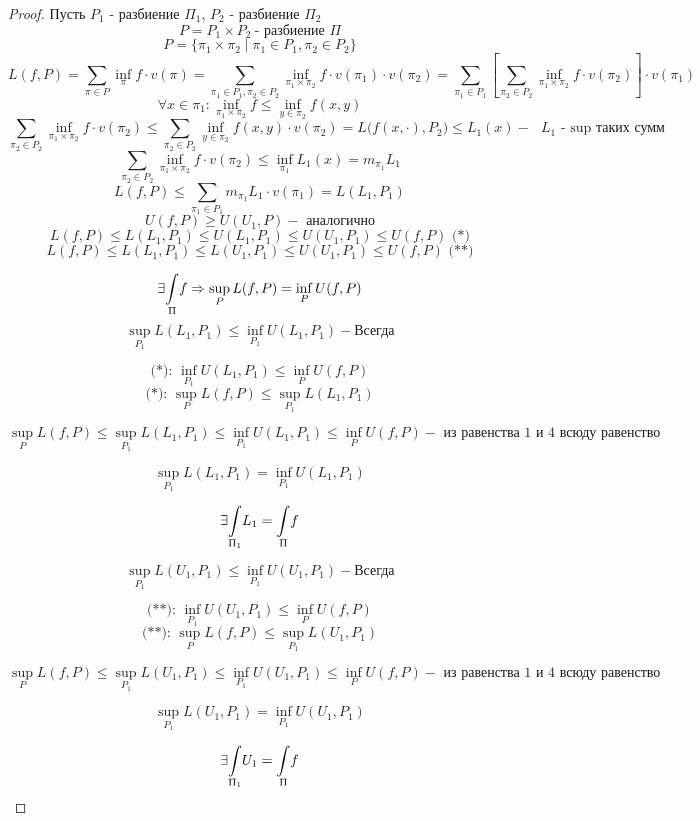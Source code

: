     \begin{proof}
        \par Пусть $P_1$ - разбиение $\Pi_1$, $P_2$ - разбиение $\Pi_2$
        $$P = P_1 \times P_2 \ \text{- разбиение } \Pi$$ 
        $$P = \{\pi_1 \times \pi_2 \mid \pi_1 \in P_1, \pi_2 \in P_2\}$$
        $$L(f, P) = \sum\limits_{\pi \in P} \inf_{\pi} f \cdot v(\pi) = \sum\limits_{\pi_1 \in P_1, \pi_2 \in P_2} \inf_{\pi_1 \times \pi_2} f \cdot v(\pi_1) \cdot v(\pi_2) = \sum\limits_{\pi_1 \in P_1} \left[ \sum\limits_{\pi_2 \in P_2} \inf_{\pi_1 \times \pi_2} f \cdot v(\pi_2) \right] \cdot v(\pi_1)$$
        $$\forall x\in \pi_1: \inf_{\pi_1 \times \pi_2} f \le \inf_{y \in \pi_2} f(x, y)$$
        $$\sum\limits_{\pi_2 \in P_2} \inf_{\pi_1 \times \pi_2} f \cdot v(\pi_2) \le \sum\limits_{\pi_2 \in P_2} \inf_{y \in \pi_2} f(x,y) \cdot v(\pi_2) = L\big(f(x, \cdot), P_2\big) \le L_1 (x) - \text{ $L_1$ - sup таких сумм} $$
        $$\sum\limits_{\pi_2 \in P_2} \inf_{\pi_1 \times \pi_2} f \cdot v(\pi_2) \le \inf_{\pi_1} L_1(x) = m_{\pi_1} L_1$$
        $$L(f, P) \le \sum\limits_{\pi_1 \in P_1} m_{\pi_1} L_1 \cdot v(\pi_1) = L(L_1, P_1)$$
        $$U(f, P) \ge U(U_1, P) - \text{ аналогично}$$
        $$L(f, P) \le L(L_1, P_1) \le U(L_1, P_1) \le U(U_1, P_1) \le U(f, P) \text{ (*)} $$
        $$L(f, P) \le L(L_1, P_1) \le L(U_1, P_1) \le U(U_1, P_1) \le U(f, P) \text{ (**)}$$

        $$\exists \underset{\Pi}{\int} f \Rightarrow \sup_{P} L(f, P) = \inf_{P} U(f, P)$$
        $$\sup_{P_1} L(L_1, P_1) \le \inf_{P_1} U(L_1, P_1) - \text{Всегда}$$
        
        $$\text{(*): } \inf_{P_1} U(L_1, P_1) \le \inf_{P} U(f, P)$$
        $$\text{(*): } \sup_{P} L(f, P) \le \sup_{P_1} L(L_1, P_1)$$

        $$\sup_{P} L(f, P) \le \sup_{P_1} L(L_1, P_1) \le \inf_{P_1} U(L_1, P_1) \le \inf_{P} U(f, P) - \text{ из равенства 1 и 4 всюду равенство}$$

        $$\sup_{P_1} L(L_1, P_1) = \inf_{P_1} U(L_1, P_1)$$

        $$\exists \underset{\Pi_1}{\int} L_1 = \underset{\Pi}{\int} f$$

        $$\sup_{P_1} L(U_1, P_1) \le \inf_{P_1} U(U_1, P_1) - \text{Всегда}$$
        
        $$\text{(**): } \inf_{P_1} U(U_1, P_1) \le \inf_{P} U(f, P)$$
        $$\text{(**): } \sup_{P} L(f, P) \le \sup_{P_1} L(U_1, P_1)$$

        $$\sup_{P} L(f, P) \le \sup_{P_1} L(U_1, P_1) \le \inf_{P_1} U(U_1, P_1) \le \inf_{P} U(f, P) - \text{ из равенства 1 и 4 всюду равенство}$$

        $$\sup_{P_1} L(U_1, P_1) = \inf_{P_1} U(U_1, P_1)$$

        $$\exists \underset{\Pi_1}{\int} U_1 = \underset{\Pi}{\int} f$$



    \end{proof}

